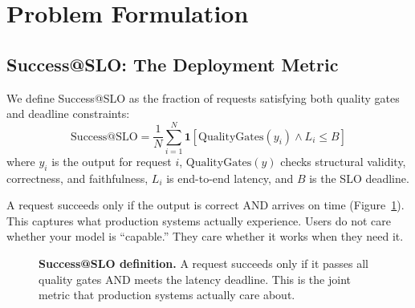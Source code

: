 \documentclass[11pt]{article}
\begin{document}
\section{Problem Formulation}
\label{sec:problem}

\subsection{Success@SLO: The Deployment Metric}

We define Success@SLO as the fraction of requests satisfying both quality gates and deadline constraints:
\begin{equation}
\text{Success@SLO} = \frac{1}{N} \sum_{i=1}^{N} \mathbf{1}\left[\text{QualityGates}(y_i) \land L_i \leq B\right]
\label{eq:success-at-slo}
\end{equation}
where $y_i$ is the output for request $i$, $\text{QualityGates}(y)$ checks structural validity, correctness, and faithfulness, $L_i$ is end-to-end latency, and $B$ is the SLO deadline.

A request succeeds only if the output is correct AND arrives on time (Figure~\ref{fig:success-at-slo}).
This captures what production systems actually experience.
Users do not care whether your model is ``capable.''
They care whether it works when they need it.

\begin{figure}[t]
\centering
{}
\caption{\textbf{Success@SLO definition.} A request succeeds only if it passes all quality gates AND meets the latency deadline.  This is the joint metric that production systems actually care about.}
\label{fig:success-at-slo}
\end{figure}
\end{document}
